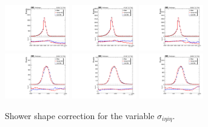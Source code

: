 \begin{figure}[htb]
	\centering
	\includegraphics[width=0.25\textwidth]{fig/ss_corr/phosieie_16_EB_Z.pdf}
	\includegraphics[width=0.25\textwidth]{fig/ss_corr/ph_sieie_17_EB_Z.pdf}
	\includegraphics[width=0.25\textwidth]{fig/ss_corr/phosieie_18_EB_Z.pdf}\\
	\includegraphics[width=0.25\textwidth]{fig/ss_corr/phosieie_16_EE_Z.pdf}
	\includegraphics[width=0.25\textwidth]{fig/ss_corr/ph_sieie_17_EE_Z.pdf}
	\includegraphics[width=0.25\textwidth]{fig/ss_corr/phosieie_18_EE_Z.pdf}\\	
	\label{fig:sieie_Z}
	\caption{Shower shape correction for the variable $\sigma_{i\eta i\eta}$.}
\end{figure}
